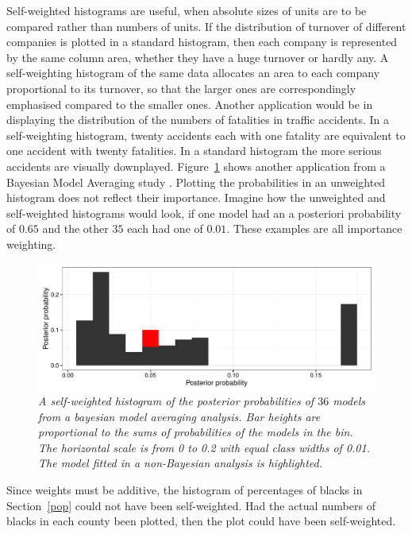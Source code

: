 \documentclass{svmult}
\begin{document}
Self-weighted histograms are useful, when absolute sizes of units are to be compared rather than numbers of units.  If the distribution of turnover of different companies is plotted in a standard histogram, then each company is represented by the same column area, whether they have a huge turnover or hardly any.  A self-weighting histogram of the same data allocates an area to each company proportional to its turnover, so that the larger ones are correspondingly emphasised compared to the smaller ones.  Another application would be in displaying the distribution of the numbers of fatalities in traffic accidents.  In a self-weighting histogram, twenty accidents each with one fatality are equivalent to one accident with twenty fatalities.  In a standard histogram the more serious accidents are visually downplayed.  Figure~\ref{uvw} shows another application from a Bayesian Model Averaging study \citep{unwin:2003}.  Plotting the probabilities in an unweighted histogram does not reflect their importance.  Imagine how the unweighted and self-weighted histograms would look, if one model had an a posteriori probability of $0.65$ and the other $35$ each had one of $0.01$.  These examples are all importance weighting.

\begin{figure}[htbp]
  \centering
  \includegraphics[width=\linewidth]{post-prob}
  \caption{\em A self-weighted histogram of the posterior probabilities of $36$ models from a bayesian model averaging analysis.  Bar heights are proportional to the sums of probabilities of the models in the bin.  The horizontal scale is from 0 to 0.2 with equal class widths of 0.01.  The model fitted in a non-Bayesian analysis is highlighted.}
  \label{uvw}
\end{figure} 

Since weights must be additive, the histogram of percentages of blacks in Section~\ref{pop} could not have been self-weighted.  Had the actual numbers of blacks in each county been plotted, then the plot could have been self-weighted.
\end{document}
